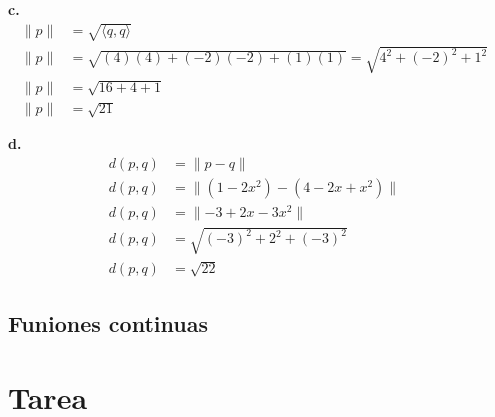 \documentclass{article}
\begin{document}
        \textbf{c.}
            \begin{align*}
                \parallel p\parallel&= \sqrt{\langle q,q\rangle} & \\
                \parallel p\parallel&= \sqrt{(4)(4)+(-2)(-2)+(1)(1)}=\sqrt{4^{2}+(-2)^{2}+1^{2}} & \\
                \parallel p\parallel&= \sqrt{16+4+1} & \\
                \parallel p\parallel&= \sqrt{21}
            \end{align*}

        \textbf{d.}
            \begin{align*}
                d(p,q)&= \parallel p-q\parallel & \\
                d(p,q)&= \parallel (1-2x^{2})-(4-2x+x^{2})\parallel & \\
                d(p,q)&= \parallel -3+2x-3x^{2}\parallel & \\
                d(p,q)&= \sqrt{(-3)^{2}+2^{2}+(-3)^{2}} & \\
                d(p,q)&= \sqrt{22}
            \end{align*}

    \subsection{Funiones continuas}

\section{Tarea}

\end{document}

